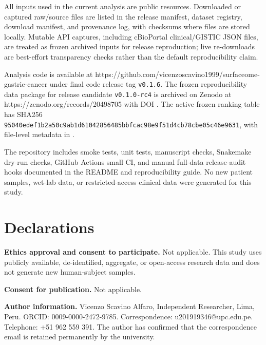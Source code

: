 \documentclass[preprint,12pt,authoryear]{elsarticle}
\begin{document}
All inputs used in the current analysis are public resources. Downloaded or captured raw/\allowbreak{}source files are listed in the release manifest, dataset registry, download manifest, and provenance log, with checksums where files are stored locally. Mutable API captures, including cBioPortal clinical/\allowbreak{}GISTIC JSON files, are treated as frozen archived inputs for release reproduction;\allowbreak{} live re-downloads are best-effort transparency checks rather than the default reproducibility claim.

Analysis code is available at https:/\allowbreak{}/\allowbreak{}github.com/\allowbreak{}vicenzoscavino1999/\allowbreak{}surfaceome-gastric-cancer under final code release tag \texttt{v0.1.6}. The frozen reproducibility data package for release candidate \texttt{v0.1.0-rc4} is archived on Zenodo at https:/\allowbreak{}/\allowbreak{}zenodo.org/\allowbreak{}records/\allowbreak{}20498705 with DOI . The active frozen ranking table has SHA256 \texttt{9504\allowbreak{}0ede\allowbreak{}f1b2\allowbreak{}a50c\allowbreak{}9ab1\allowbreak{}d610\allowbreak{}4285\allowbreak{}6485\allowbreak{}bbfc\allowbreak{}ac98\allowbreak{}e9f5\allowbreak{}1d4c\allowbreak{}b78c\allowbreak{}be05\allowbreak{}c46e\allowbreak{}9631}, with file-level metadata in .

The repository includes smoke tests, unit tests, manuscript checks, Snakemake dry-run checks, GitHub Actions small CI, and manual full-data release-audit hooks documented in the README and reproducibility guide. No new patient samples, wet-lab data, or restricted-access clinical data were generated for this study.

\FloatBarrier
\section{Declarations}

\textbf{Ethics approval and consent to participate.} Not applicable. This study uses publicly available, de-identified, aggregate, or open-access research data and does not generate new human-subject samples.

\textbf{Consent for publication.} Not applicable.

\textbf{Author information.} Vicenzo Scavino Alfaro, Independent Researcher, Lima, Peru. ORCID: 0009-0000-2472-9785. Correspondence: u201919346@upc.edu.pe. Telephone: +\allowbreak{}51 962 559 391. The author has confirmed that the correspondence email is retained permanently by the university.
\end{document}
